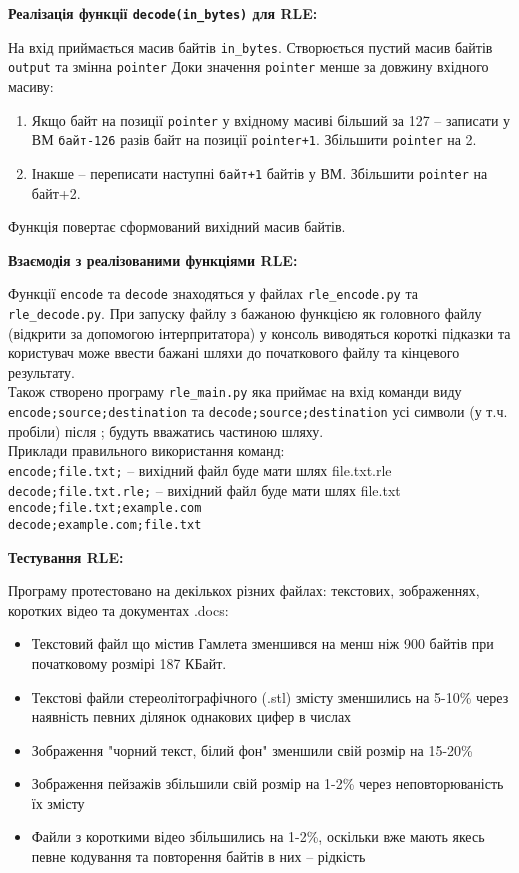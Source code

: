 \documentclass{article}
\def\code#1{\texttt{#1}}
\begin{document}
\textbf{Реалізація функції \code{decode(in\_bytes)} для RLE:}
\\\indent

На вхід приймається масив байтів \code{in\_bytes}. Створюється пустий масив байтів \code{output} та змінна \code{pointer}
Доки значення \code{pointer} менше за довжину вхідного масиву:
\begin{enumerate}
\item Якщо байт на позиції \code{pointer} у вхідному масиві більший за 127 -- записати у ВМ \code{байт-126} разів байт на позиції \code{pointer+1}. Збільшити \code{pointer} на 2.
\item Інакше -- переписати наступні \code{байт+1} байтів у ВМ. Збільшити \code{pointer} на байт+2.
\end{enumerate}
Функція повертає сформований вихідний масив байтів.\\\indent

\textbf{Взаємодія з реалізованими функціями RLE:}\\\indent

Функції \code{encode} та \code{decode} знаходяться у файлах \code{rle\_encode.py} та\\ \code{rle\_decode.py}. При запуску файлу з бажаною функцією як головного файлу (відкрити за допомогою інтерпритатора) у консоль виводяться короткі підказки та користувач може ввести бажані шляхи до початкового файлу та кінцевого результату.\\\indent
Також створено програму \code{rle\_main.py} яка приймає на вхід команди виду \code{encode;source;destination} та \code{decode;source;destination} усі символи (у т.ч. пробіли) після ; будуть вважатись частиною шляху.\\\indent
Приклади правильного використання команд:\\
\code{encode;file.txt;} -- вихідний файл буде мати шлях file.txt.rle\\
\code{decode;file.txt.rle;} -- вихідний файл буде мати шлях file.txt\\
\code{encode;file.txt;example.com}\\
\code{decode;example.com;file.txt}\\\indent

\textbf{Тестування RLE:}\\\indent

Програму протестовано на декількох різних файлах: текстових, зображеннях, коротких відео та документах .docs:
\begin{itemize}
\item Текстовий файл що містив Гамлета зменшився на менш ніж 900 байтів при початковому розмірі 187 КБайт.
\item Текстові файли стереолітографічного (.stl) змісту зменшились на 5-10\% через наявність певних ділянок однакових цифер в числах
\item Зображення "чорний текст, білий фон" зменшили свій розмір на 15-20\%
\item Зображення пейзажів збільшили свій розмір на 1-2\% через неповторюваність їх змісту
\item Файли з короткими відео збільшились на 1-2\%, оскільки вже мають якесь певне кодування та повторення байтів в них -- рідкість
\end{itemize}
\end{document}

